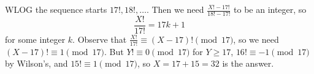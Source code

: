\begin{solution}
WLOG the sequence starts $17!,18!,\ldots$. Then we need $\frac{X!-17!}{18!-17!}$ to be an integer, so \[\frac{X!}{17!}=17k+1\] for some integer $k$. Observe that $\frac{X!}{17!}\equiv\left(X-17\right)!\pmod{17}$, so we need $\left(X-17\right)!\equiv1\pmod{17}$. But $Y!\equiv0\pmod{17}$ for $Y\geq17$, $16!\equiv-1\pmod{17}$ by Wilson's, and $15!\equiv1\pmod{17}$, so $X=17+15=\boxed{32}$ is the answer.
\end{solution}
